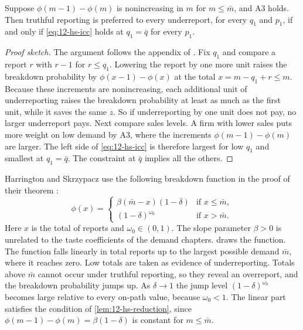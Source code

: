 \begin{lemma}\label{lem:12-hs-reduction}
Suppose $\phi(m-1) - \phi(m)$ is nonincreasing in $m$ for $m \le \bar m$, and A3 holds. Then truthful reporting is
preferred to every underreport, for every $q_1$ and $p_1$, if and only if \eqref{eq:12-hs-icc} holds at
$q_1 = \bar q$ for every $p_1$.
\end{lemma}

\begin{proof}[Proof sketch]
The argument follows the appendix of \citet{HarringtonSkrzypacz2011}. Fix $q_1$ and compare a report $r$ with
$r - 1$ for $r \le q_1$. Lowering the report by one more unit raises the breakdown probability by
$\phi(x - 1) - \phi(x)$ at the total $x = m - q_1 + r \le m$. Because these increments are nonincreasing, each
additional unit of underreporting raises the breakdown probability at least as much as the first unit, while it
saves the same $z$. So if underreporting by one unit does not pay, no larger underreport pays. Next compare sales
levels. A firm with lower sales puts more weight on low demand by A3, where the increments $\phi(m-1) - \phi(m)$ are
larger. The left side of \eqref{eq:12-hs-icc} is therefore largest for low $q_1$ and smallest at $q_1 = \bar q$.
The constraint at $\bar q$ implies all the others.
\end{proof}

Harrington and Skrzypacz use the following breakdown function in the proof of their theorem
\citep[equation (3)]{HarringtonSkrzypacz2011}:
\begin{equation}\label{eq:12-hs-phi}
  \phi(x) =
  \begin{cases}
    \beta(\bar m - x)(1 - \delta) & \text{if } x \le \bar m,\\[2pt]
    (1 - \delta)^{\omega_0} & \text{if } x > \bar m.
  \end{cases}
\end{equation}
Here $x$ is the total of reports and $\omega_0 \in (0,1)$. The slope parameter $\beta > 0$ is unrelated to the taste
coefficients of the demand chapters.  draws the function. The function falls linearly in
total reports up to the largest possible demand $\bar m$, where it reaches zero. Low totals are taken as evidence
of underreporting. Totals above $\bar m$ cannot occur under truthful reporting, so they reveal an overreport, and
the breakdown probability jumps up. As $\delta \to 1$ the jump level $(1-\delta)^{\omega_0}$ becomes large
relative to every on-path value, because $\omega_0 < 1$. The linear part satisfies the condition of
\cref{lem:12-hs-reduction}, since $\phi(m-1) - \phi(m) = \beta(1-\delta)$ is constant for $m \le \bar m$.

